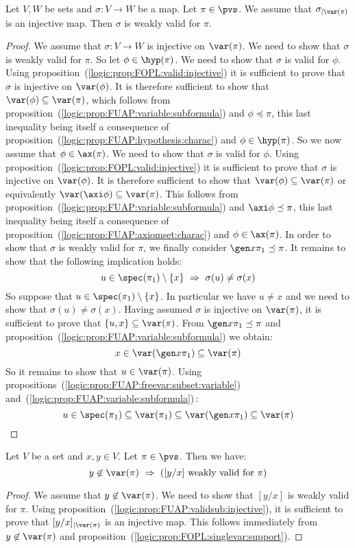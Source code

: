 \begin{prop}\label{logic:prop:FUAP:validsub:injective}
Let $V, W$ be sets and $\sigma:V\to W$ be a map. Let $\pi\in\pvs$.
We assume that $\sigma_{|\var(\pi)}$ is an injective map. Then
$\sigma$ is weakly valid for $\pi$.
\end{prop}
\begin{proof}
We assume that $\sigma:V\to W$ is injective on $\var(\pi)$. We need
to show that $\sigma$ is weakly valid for $\pi$. So let
$\phi\in\hyp(\pi)$. We need to show that $\sigma$ is valid for
$\phi$. Using proposition~(\ref{logic:prop:FOPL:valid:injective}) it
is sufficient to prove that $\sigma$ is injective on $\var(\phi)$.
It is therefore sufficient to show that
$\var(\phi)\subseteq\var(\pi)$, which follows from
proposition~(\ref{logic:prop:FUAP:variable:subformula}) and
$\phi\preceq\pi$, this last inequality being itself a consequence of
proposition~(\ref{logic:prop:FUAP:hypothesis:charac}) and
$\phi\in\hyp(\pi)$. So we now assume that $\phi\in\ax(\pi)$. We need
to show that $\sigma$ is valid for $\phi$. Using
proposition~(\ref{logic:prop:FOPL:valid:injective}) it is sufficient
to prove that $\sigma$ is injective on $\var(\phi)$. It is therefore
sufficient to show that $\var(\phi)\subseteq\var(\pi)$ or
equivalently $\var(\axi\phi)\subseteq\var(\pi)$. This follows from
proposition~(\ref{logic:prop:FUAP:variable:subformula}) and
$\axi\phi\preceq\pi$, this last inequality being itself a
consequence of proposition~(\ref{logic:prop:FUAP:axiomset:charac})
and $\phi\in\ax(\pi)$. In order to show that $\sigma$ is weakly
valid for $\pi$, we finally consider $\gen x\pi_{1}\preceq\pi$. It
remains to show that the following implication holds:
    \[
    u\in\spec(\pi_{1})\setminus\{x\}\ \Rightarrow\
    \sigma(u)\neq\sigma(x)
    \]
So suppose that $u\in\spec(\pi_{1})\setminus\{x\}$. In particular we
have $u\neq x$ and we need to show that $\sigma(u)\neq\sigma(x)$.
Having assumed $\sigma$ is injective on $\var(\pi)$, it is
sufficient to prove that $\{u,x\}\subseteq\var(\pi)$. From $\gen
x\pi_{1}\preceq\pi$ and
proposition~(\ref{logic:prop:FUAP:variable:subformula}) we obtain:
    \[
    x\in\var(\gen x\pi_{1})\subseteq\var(\pi)
    \]
So it remains to show that $u\in\var(\pi)$. Using
propositions~(\ref{logic:prop:FUAP:freevar:subset:variable})
and~(\ref{logic:prop:FUAP:variable:subformula})\,:
    \[
    u\in\spec(\pi_{1})\subseteq\var(\pi_{1})\subseteq \var(\gen x\pi_{1})\subseteq\var(\pi)
    \]
\end{proof}

\begin{prop}\label{logic:prop:FUAP:validsub:singlevar}
Let $V$ be a set and $x,y\in V$. Let $\pi\in\pvs$. Then we have:
    \[
    y\not\in\var(\pi)\ \Rightarrow\ (\mbox{$[y/x]$ weakly valid for
    $\pi$})
    \]
\end{prop}
\begin{proof}
We assume that $y\not\in\var(\pi)$. We need to show that $[y/x]$ is
weakly valid for $\pi$. Using
proposition~(\ref{logic:prop:FUAP:validsub:injective}), it is
sufficient to prove that $[y/x]_{|\var(\pi)}$ is an injective map.
This follows immediately from $y\not\in\var(\pi)$ and
proposition~(\ref{logic:prop:FOPL:singlevar:support}).
\end{proof}

